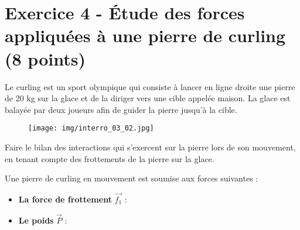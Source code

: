 \documentclass{exam}
\begin{document}
\section*{Exercice 4 - Étude des forces appliquées à une pierre de curling (8 points)}

Le curling est un sport olympique qui consiste à lancer en ligne droite une pierre de 20 kg sur la glace et de la diriger vers une cible appelée maison. La glace est balayée par deux joueurs afin de guider la pierre jusqu’à la cible.
\begin{figure}[H]
  \centering
  \texttt{[image: img/interro\_03\_02.jpg]}
\end{figure}
\begin{questions}
  \question[2] Faire le bilan des interactions qui s’exercent sur la pierre lors de son mouvement, en tenant compte des frottements de la pierre sur la glace.
  \begin{solution}
    Une pierre de curling en mouvement est soumise aux forces suivantes :
    
    \begin{itemize}
        \item \textbf{La force de frottement} $\vec{f_1}$ :  
        
        \item \textbf{Le poids} $\vec{P}$ :  
    

\end{itemize}
\end{solution}
\end{questions}
\end{document}
